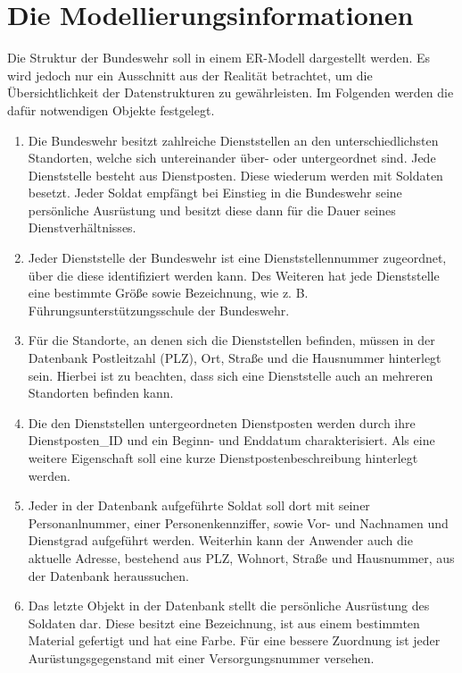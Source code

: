     \section{Die Modellierungsinformationen}
			Die Struktur der Bundeswehr soll in einem ER-Modell dargestellt werden.
			Es wird jedoch nur ein Ausschnitt aus der Realit\"at betrachtet, um die
			\"Ubersichtlichkeit der Datenstrukturen zu gew\"ahrleisten. Im Folgenden
			werden die daf\"ur notwendigen Objekte festgelegt.
        \begin{enumerate}
          \item Die Bundeswehr besitzt zahlreiche Dienststellen an den unterschiedlichsten Standorten, welche sich untereinander \"uber- oder untergeordnet sind. Jede Dienststelle besteht aus Dienstposten. Diese wiederum werden mit Soldaten besetzt. Jeder Soldat empf\"angt bei Einstieg in die Bundeswehr seine pers\"onliche Ausr\"ustung und besitzt diese dann f\"ur die Dauer seines Dienstverh\"altnisses.
          \item Jeder Dienststelle der Bundeswehr ist eine Dienststellennummer zugeordnet, \"uber die diese identifiziert werden kann. Des Weiteren hat jede Dienststelle eine bestimmte Gr\"o\ss e sowie Bezeichnung, wie z. B. F\"uhrungsunterst\"utzungsschule der Bundeswehr.
          \item F\"ur die Standorte, an denen sich die Dienststellen befinden, m\"ussen in der Datenbank Postleitzahl (PLZ), Ort, Stra\ss e und die Hausnummer hinterlegt sein. Hierbei ist zu beachten, dass sich eine Dienststelle auch an mehreren Standorten befinden kann.
          \item Die den Dienststellen untergeordneten Dienstposten werden durch ihre Dienstposten\_ID und ein Beginn- und Enddatum charakterisiert. Als eine weitere Eigenschaft soll eine kurze Dienstpostenbeschreibung hinterlegt werden.
          \item Jeder in der Datenbank aufgef\"uhrte Soldat soll dort mit seiner Personanlnummer, einer Personenkennziffer, sowie Vor- und Nachnamen und Dienstgrad aufgef\"uhrt werden. Weiterhin kann der Anwender auch die aktuelle Adresse, bestehend aus PLZ, Wohnort, Stra\ss e und Hausnummer, aus der Datenbank heraussuchen.
          \item Das letzte Objekt in der Datenbank stellt die pers\"onliche Ausr\"ustung des Soldaten dar. Diese besitzt eine Bezeichnung, ist aus einem bestimmten Material gefertigt und hat eine Farbe. F\"ur eine bessere Zuordnung ist jeder Aur\"ustungsgegenstand mit einer Versorgungsnummer versehen.
        \end{enumerate}
